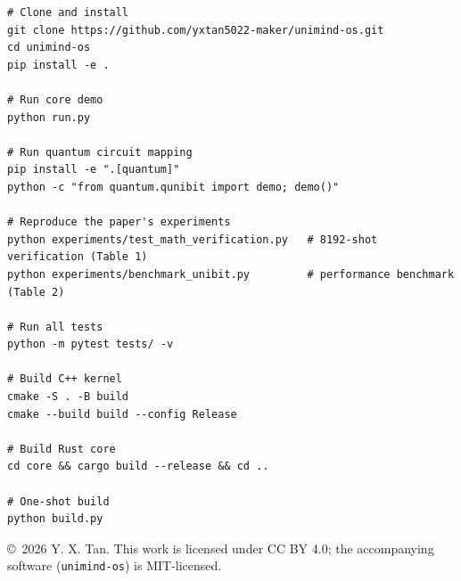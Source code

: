 ﻿\documentclass[12pt,a4paper]{article}
\begin{document}
\begin{verbatim}
# Clone and install
git clone https://github.com/yxtan5022-maker/unimind-os.git
cd unimind-os
pip install -e .

# Run core demo
python run.py

# Run quantum circuit mapping
pip install -e ".[quantum]"
python -c "from quantum.qunibit import demo; demo()"

# Reproduce the paper's experiments
python experiments/test_math_verification.py   # 8192-shot verification (Table 1)
python experiments/benchmark_unibit.py         # performance benchmark (Table 2)

# Run all tests
python -m pytest tests/ -v

# Build C++ kernel
cmake -S . -B build
cmake --build build --config Release

# Build Rust core
cd core && cargo build --release && cd ..

# One-shot build
python build.py
\end{verbatim}

\vfill
\begin{center}
\small\copyright\ 2026 Y. X. Tan. This work is licensed under CC BY 4.0; the accompanying software (\texttt{unimind-os}) is MIT-licensed.
\end{center}
\end{document}
